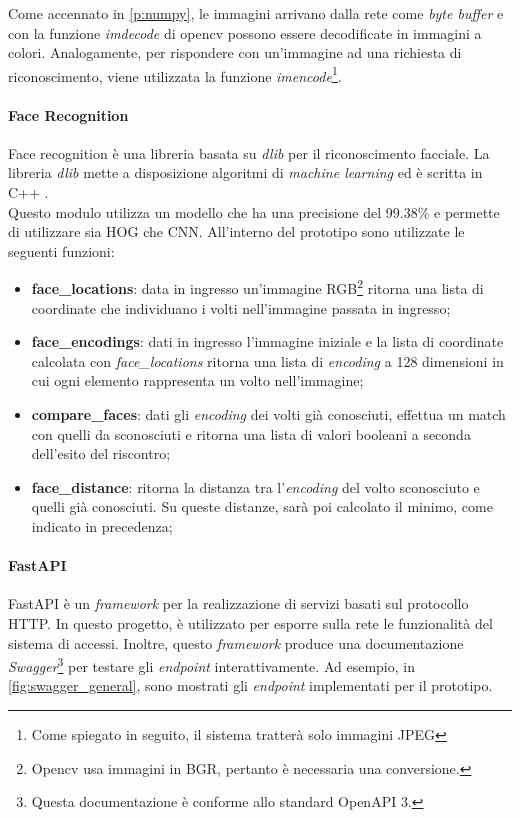 Come accennato in \cref{p:numpy}, le immagini arrivano dalla rete come \textit{byte buffer} e con la funzione \textit{imdecode} di opencv possono essere decodificate in immagini a colori. Analogamente, per rispondere con un'immagine ad una richiesta di riconoscimento, viene utilizzata la funzione \textit{imencode}\footnote{Come spiegato in seguito, il sistema tratterà solo immagini JPEG}.

\paragraph{Face Recognition}\label{p:face_recognition}
Face recognition è una libreria basata su \textit{dlib} per il riconoscimento facciale. La libreria \textit{dlib} mette a disposizione algoritmi di \textit{machine learning} ed è scritta in C++ \cite{dlib}.\\
Questo modulo utilizza un modello che ha una precisione del 99.38\% \cite{Geitgey_face_recognition} e permette di utilizzare sia HOG che CNN. All'interno del prototipo sono utilizzate le seguenti funzioni:
\begin{itemize}
    \item \textbf{face\_locations}: data in ingresso un'immagine RGB\footnote{Opencv usa immagini in BGR, pertanto è necessaria una conversione.} ritorna una lista di coordinate che individuano i volti nell'immagine passata in ingresso;
    \item \textbf{face\_encodings}: dati in ingresso l'immagine iniziale e la lista di coordinate calcolata con \textit{face\_locations} ritorna una lista di \textit{encoding} a 128 dimensioni in cui ogni elemento rappresenta un volto nell'immagine;
    \item \textbf{compare\_faces}: dati gli \textit{encoding} dei volti già conosciuti, effettua un match con quelli da sconosciuti e ritorna una lista di valori booleani a seconda dell'esito del riscontro;
    \item \textbf{face\_distance}: ritorna la distanza tra l'\textit{encoding} del volto sconosciuto e quelli già conosciuti. Su queste distanze, sarà poi calcolato il minimo, come indicato in precedenza;
\end{itemize}

\paragraph{FastAPI}
FastAPI è un \textit{framework} per la realizzazione di servizi basati sul protocollo HTTP. In questo progetto, è utilizzato per esporre sulla rete le funzionalità del sistema di accessi. Inoltre, questo \textit{framework} produce una documentazione \textit{Swagger}\footnote{Questa documentazione è conforme allo standard OpenAPI 3.} per testare gli \textit{endpoint} interattivamente. Ad esempio, in \cref{fig:swagger_general}, sono mostrati gli \textit{endpoint} implementati per il prototipo.

